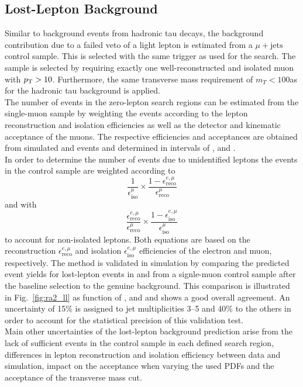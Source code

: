 \subsection{Lost-Lepton Background}
\label{subsec:RA2_lostlepton}
Similar to background events from hadronic tau decays, the background contribution due to a failed veto of a light lepton is estimated from a $\mu + \mathrm{jets}$ control sample. This is selected with the same trigger as used for the search. The sample is selected by requiring exactly one well-reconstructed and isolated muon with $p_{\text{T}} > 10$\gev. Furthermore, the same transverse mass requirement of $m_T < 100$\gev as for the hadronic tau background is applied. \\ 
The number of events in the zero-lepton search regions can be estimated from the single-muon sample by weighting the events according to the lepton reconstruction and isolation efficiencies as well as the detector and kinematic acceptance of the muons. The respective efficiencies and acceptances are obtained from simulated \ttbar and \WJets events and determined in intervals of \HT, \MHT and \NJets. \\
In order to determine the number of events due to unidentified leptons the events in the control sample are weighted according to
\begin{equation*}
\frac{1}{\epsilon_\mathrm{iso}^\mathrm{\mu}} \times \frac{1-\epsilon_\mathrm{reco}^{e, \mu}}{\epsilon_\mathrm{reco}^{\mu}}
\end{equation*}
and with
\begin{equation*}
\frac{\epsilon_\mathrm{reco}^{e, \mu}}{\epsilon_\mathrm{reco}^{\mu}} \times \frac{1-\epsilon_\mathrm{iso}^{e, \mu}}{\epsilon_\mathrm{iso}^{\mu}}
\end{equation*}
to account for non-isolated leptons. Both equations are based on the reconstruction $\epsilon_\mathrm{reco}^{e, \mu}$ and isolation $\epsilon_\mathrm{iso}^{e, \mu}$ efficiencies of the electron and muon, respectively. 
The method is validated in simulation by comparing the predicted event yields for lost-lepton events in \ttbar and \WJets from a signle-muon control sample after the baseline selection to the genuine background. This comparison is illustrated in Fig.~\ref{fig:ra2_ll} as function of \HT, \MHT and \NJets and shows a good overall agreement. An uncertainty of 15\% is assigned to jet multiplicities 3--5 and 40\% to the others in order to account for the statistical precision of this validation test.\\
Main other uncertainties of the lost-lepton background prediction arise from the lack of sufficient events in the control sample in each defined search region, differences in lepton reconstruction and isolation efficiency between data and simulation, impact on the acceptance when varying the used PDFs and the acceptance of the transverse mass cut.

